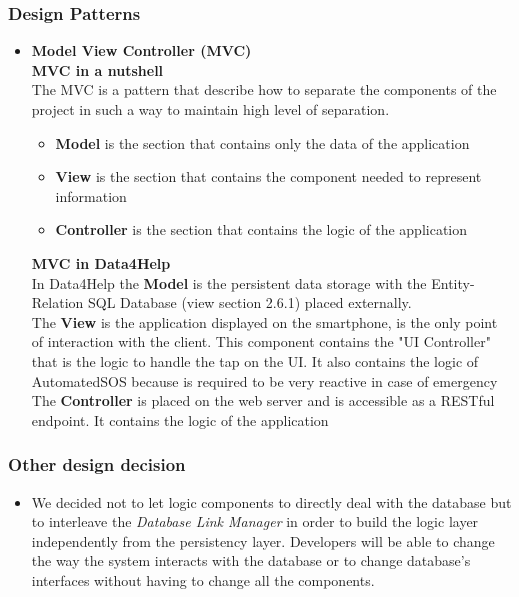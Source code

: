 \documentclass[DD.tex]{subfiles}
\begin{document}
\subsubsection{Design Patterns}

\begin{itemize}
	\item \textbf{Model View Controller (MVC)}\\
		\textbf{MVC in a nutshell}\\
		The MVC is a pattern that describe how to separate the components of the project in such a way to maintain high level of separation. \\
		\vspace{-5mm}
		\begin{itemize}
		\setlength\itemsep{-0.9em}
			\item\textbf{Model} is the section that contains only the data of the application\\
			\item\textbf{View} is the section that contains the component needed to represent information\\
			\item\textbf{Controller} is the section that contains the logic of the application\\
		\end{itemize}
		\textbf{MVC in Data4Help}\\
		In Data4Help the \textbf{Model} is the persistent data storage with the Entity-Relation SQL Database (view section 2.6.1) placed externally.\\
		The \textbf{View} is the application displayed on the smartphone, is the only point of interaction with the client.
		This component contains the "UI Controller" that is the logic to handle the tap on the UI. It also contains the logic of AutomatedSOS because is required to be very reactive in case of emergency \\
		The \textbf{Controller} is placed on the web server and is accessible as a RESTful endpoint. It contains the logic of the application \\
\end{itemize}

\subsubsection{Other design decision}

\begin{itemize}
	\item We decided not to let logic components to directly deal with the database but to interleave the \textit{Database Link Manager} in order to build the logic layer independently from the persistency layer. Developers will be able to change the way the system interacts with the database or to change database's interfaces without having to change all the components. 
\end{itemize}
\end{document}
